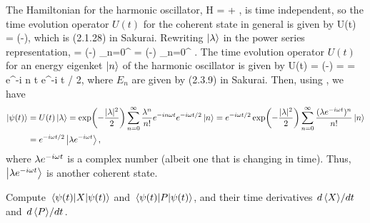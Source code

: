 \begin{solution}
	The Hamiltonian for the harmonic oscillator,
	\beqn \label{ham}
		H =  + ,
	\eeqn
	is time independent, so the time evolution operator $U(t)$ for the coherent state in general is given by
	\beqn \label{timeevo}
		U(t) = \exp(-),
	\eeqn
	which is (2.1.28) in Sakurai.  Rewriting $\ket{\lambda}$ in the power series representation,
	\beqn \label{pow}
		\klam = \exp(-) \sum_{n=0}^\infty {} \ko
		= \exp(-) \sum_{n=0}^\infty {} \kn.
	\eeqn
	The time evolution operator $U(t)$ for an energy eigenket $\ket{n}$ of the harmonic oscillator is given by
	\beq
		U(t) \kn = \exp(-) \kn
		=  \kn
		= e^{-i n \omega t} e^{-i \omega t / 2},
	\eeq
	where $E_n$ are given by (2.3.9) in Sakurai.  Then, using , we have
	\begin{align}
		\ket{\psi(t)} &= U(t) \ket{\lambda}
		= \exp(-\frac{|\lambda|^2}{2}) \sum_{n=0}^\infty \frac{\lambda^n}{n!} e^{-i n \omega t} e^{-i \omega t / 2} \ket{n}
		= e^{-i \omega t / 2} \exp(-\frac{|\lambda|^2}{2}) \sum_{n=0}^\infty \frac{(\lambda e^{-i \omega t})^n}{n!} \ket{n} \notag \\
		&= e^{-i \omega t / 2} \ket{\lambda e^{-i \omega t}}, \label{klamt}
	\end{align}
	where $\lambda e^{-i \omega t}$ is a complex number (albeit one that is changing in time).  Thus, $\ket{\lambda e^{-i \omega t}}$ is another coherent state.
\end{solution}


\newcommand{\coswt}{\cos(\omega t)}
\newcommand{\sinwt}{\sin(\omega t)}

\begin{problem}
	Compute $\ev{X}{\psit}$ and $\ev{P}{\psit}$, and their time derivatives $\dv*{\ev{X}}{t}$ and $\dv*{\ev{P}}{t}$.
\end{problem}

